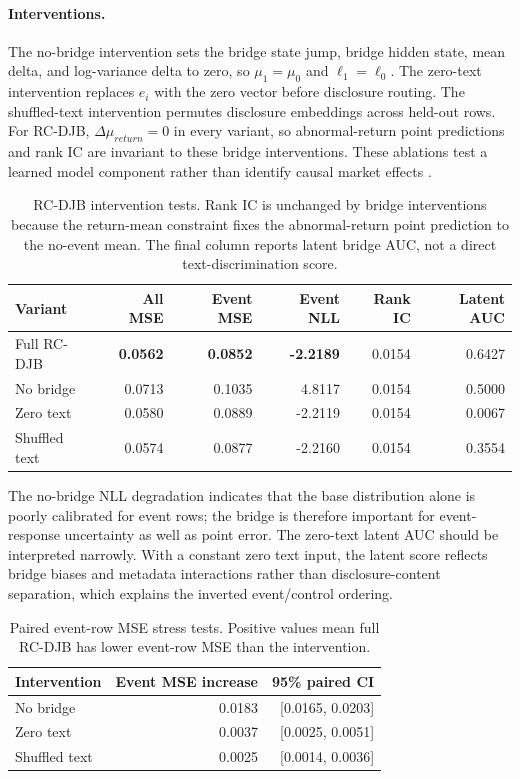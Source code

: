 \documentclass[10pt,letterpaper]{article}
\begin{document}
\paragraph{Interventions.}
The no-bridge intervention sets the bridge state jump, bridge hidden state, mean delta, and
log-variance delta to zero, so \(\mu_1=\mu_0\) and \(\ell_1=\ell_0\). The zero-text intervention
replaces \(e_i\) with the zero vector before disclosure routing. The shuffled-text intervention
permutes disclosure embeddings across held-out rows. For RC-DJB, \(\Delta\mu_{return}=0\) in every
variant, so abnormal-return point predictions and rank IC are invariant to these bridge
interventions. These ablations test a learned model component rather than identify causal market
effects \citep{rubin1974estimating,imbens2015causal}.

\begin{table}[H]
\centering
\caption{RC-DJB intervention tests. Rank IC is unchanged by bridge interventions because the
return-mean constraint fixes the abnormal-return point prediction to the no-event mean. The final
column reports latent bridge AUC, not a direct text-discrimination score.}
\label{tab:interventions}
\small
\begin{tabular}{lrrrrr}
\toprule
Variant & All MSE & Event MSE & Event NLL & Rank IC & Latent AUC \\
\midrule
Full RC-DJB & \textbf{0.0562} & \textbf{0.0852} & \textbf{-2.2189} & 0.0154 & 0.6427 \\
No bridge & 0.0713 & 0.1035 & 4.8117 & 0.0154 & 0.5000 \\
Zero text & 0.0580 & 0.0889 & -2.2119 & 0.0154 & 0.0067 \\
Shuffled text & 0.0574 & 0.0877 & -2.2160 & 0.0154 & 0.3554 \\
\bottomrule
\end{tabular}
\end{table}

The no-bridge NLL degradation indicates that the base distribution alone is poorly calibrated for
event rows; the bridge is therefore important for event-response uncertainty as well as point
error. The zero-text latent AUC should be interpreted narrowly. With a constant zero text input,
the latent score reflects bridge biases and metadata interactions rather than disclosure-content
separation, which explains the inverted event/control ordering.

\begin{table}[H]
\centering
\caption{Paired event-row MSE stress tests. Positive values mean full RC-DJB has lower event-row MSE
than the intervention.}
\label{tab:intervention-paired}
\small
\begin{tabular}{lrr}
\toprule
Intervention & Event MSE increase & 95\% paired CI \\
\midrule
No bridge & 0.0183 & [0.0165, 0.0203] \\
Zero text & 0.0037 & [0.0025, 0.0051] \\
Shuffled text & 0.0025 & [0.0014, 0.0036] \\
\bottomrule
\end{tabular}
\end{table}
\end{document}
